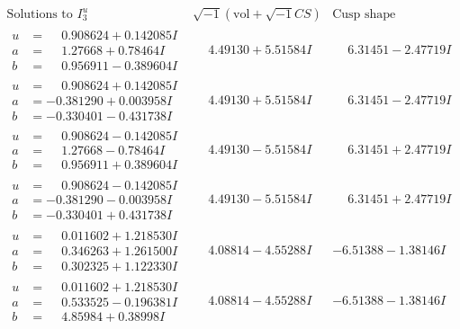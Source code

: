 \documentclass[1p]{elsarticle_modified}
\theoremstyle{definition}
\newcommand{\I}{\sqrt{-1}}
\begin{document}
$$\begin{array}{c|c|c}  
\text{Solutions to }I^u_{3}& \I (\text{vol} + \sqrt{-1}CS) & \text{Cusp shape}\\
 \hline 
\begin{aligned}
u &= \phantom{-}0.908624 + 0.142085 I \\
a &= \phantom{-}1.27668 + 0.78464 I \\
b &= \phantom{-}0.956911 - 0.389604 I\end{aligned}
 & \phantom{-}4.49130 + 5.51584 I & \phantom{-}6.31451 - 2.47719 I \\ \hline\begin{aligned}
u &= \phantom{-}0.908624 + 0.142085 I \\
a &= -0.381290 + 0.003958 I \\
b &= -0.330401 - 0.431738 I\end{aligned}
 & \phantom{-}4.49130 + 5.51584 I & \phantom{-}6.31451 - 2.47719 I \\ \hline\begin{aligned}
u &= \phantom{-}0.908624 - 0.142085 I \\
a &= \phantom{-}1.27668 - 0.78464 I \\
b &= \phantom{-}0.956911 + 0.389604 I\end{aligned}
 & \phantom{-}4.49130 - 5.51584 I & \phantom{-}6.31451 + 2.47719 I \\ \hline\begin{aligned}
u &= \phantom{-}0.908624 - 0.142085 I \\
a &= -0.381290 - 0.003958 I \\
b &= -0.330401 + 0.431738 I\end{aligned}
 & \phantom{-}4.49130 - 5.51584 I & \phantom{-}6.31451 + 2.47719 I \\ \hline\begin{aligned}
u &= \phantom{-}0.011602 + 1.218530 I \\
a &= \phantom{-}0.346263 + 1.261500 I \\
b &= \phantom{-}0.302325 + 1.122330 I\end{aligned}
 & \phantom{-}4.08814 - 4.55288 I & -6.51388 - 1.38146 I \\ \hline\begin{aligned}
u &= \phantom{-}0.011602 + 1.218530 I \\
a &= \phantom{-}0.533525 - 0.196381 I \\
b &= \phantom{-}4.85984 + 0.38998 I\end{aligned}
 & \phantom{-}4.08814 - 4.55288 I & -6.51388 - 1.38146 I \\ \hline\begin{aligned}

\end{aligned}
\end{array}$$
\end{document}
